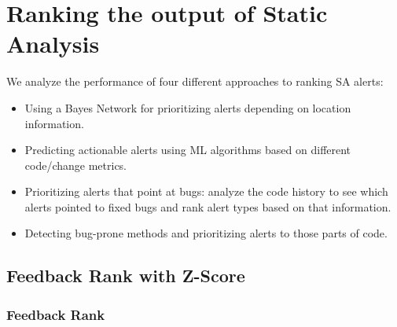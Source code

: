 
\section{Ranking the output of Static Analysis}\label{sec:ranking}


We analyze the performance of four different approaches to ranking SA alerts:
\begin{itemize}
	\item Using a Bayes Network for prioritizing alerts depending on location information.
	\item Predicting actionable alerts using ML algorithms based on different code/change metrics.
	\item Prioritizing alerts that point at bugs: analyze the code history to see which alerts pointed to fixed bugs and rank alert types based on that information.
	\item Detecting bug-prone methods and prioritizing alerts to those parts of code.
\end{itemize}

\subsection{Feedback Rank with Z-Score}


\subsubsection{Feedback Rank}

